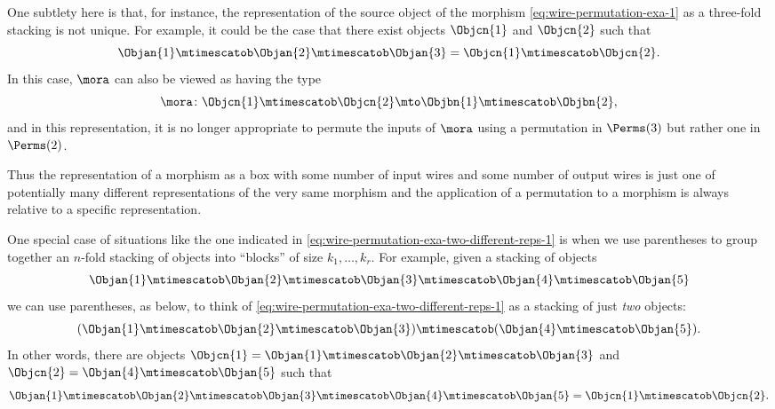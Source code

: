 One subtlety here is that, for instance, the representation of the source object of the morphism \cref{eq:wire-permutation-exa-1} as a three-fold stacking is not unique.
For example, it could be the case that there exist objects $\Objcn{1}$ and $\Objcn{2}$ such that
\begin{equation}\label{eq:wire-permutation-exa-two-different-reps-1}
    \Objan{1} \mtimescatob \Objan{2} \mtimescatob \Objan{3} = \Objcn{1} \mtimescatob \Objcn{2}.
\end{equation}
In this case, $\mora$ can also be viewed as having the type
\begin{equation}
    \mora \colon \Objcn{1} \mtimescatob \Objcn{2} \mto \Objbn{1} \mtimescatob \Objbn{2},
\end{equation}
and in this representation, it is no longer appropriate to permute the inputs of $\mora$ using a permutation in $\Perms(3)$ but rather one in $\Perms(2)$.

Thus the representation of a morphism as a box with some number of input wires and some number of output wires is just one of potentially many different representations of the very same morphism and the application of a permutation to a morphism is always relative to a specific representation.

One special case of situations like the one indicated in \cref{eq:wire-permutation-exa-two-different-reps-1} is when we use parentheses to group together an $n$-fold stacking of objects into ``blocks'' of size $k_1, \dots, k_r$.
For example, given a stacking of objects
\begin{equation}\label{eq:wire-permutation-exa-two-different-reps-2}
    \Objan{1} \mtimescatob \Objan{2} \mtimescatob \Objan{3} \mtimescatob \Objan{4} \mtimescatob \Objan{5}
\end{equation}
we can use parentheses, as below, to think of \cref{eq:wire-permutation-exa-two-different-reps-1} as a stacking of just \emph{two} objects:
\begin{equation}\label{eq:wire-permutation-exa-two-different-reps-3}
    (\Objan{1} \mtimescatob \Objan{2} \mtimescatob \Objan{3}) \mtimescatob (\Objan{4} \mtimescatob \Objan{5}).
\end{equation}
In other words, there are objects $\Objcn{1} = \Objan{1} \mtimescatob \Objan{2} \mtimescatob \Objan{3}$ and $\Objcn{2} = \Objan{4} \mtimescatob \Objan{5}$ such that
\begin{equation}
    \Objan{1} \mtimescatob \Objan{2} \mtimescatob \Objan{3} \mtimescatob \Objan{4} \mtimescatob \Objan{5} = \Objcn{1} \mtimescatob \Objcn{2}.
\end{equation}

